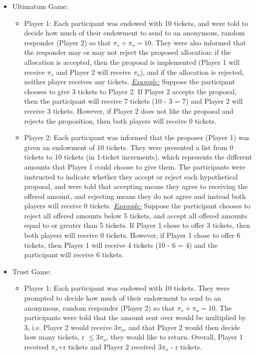 \documentclass[12pt]{article}
\begin{document}
\begin{itemize}
\item{Ultimatum Game}: 
	\begin{itemize}
		\item{Player 1}: Each participant was endowed with 10 tickets, and were told to decide how much of their endowment to send to an anonymous, random responder (Player 2) so that \(\pi_{s} + \pi_{o} = 10\). They were also informed that the responder may or may not reject the proposed allocation: if the allocation is accepted, then the proposal is implemented (Player 1 will receive \(\pi_{s}\) and Player 2 will receive \(\pi_{o}\)), and if the allocation is rejected, neither player receives any tickets.
		\subitem \underline{\textit{Example:}} Suppose the participant chooses to give 3 tickets to Player 2. If Player 2 accepts the proposal, then the participant will receive 7 tickets (10 - 3 = 7) and Player 2 will receive 3 tickets. However, if Player 2 does not like the proposal and rejects the proposition, then both players will receive 0 tickets.
		\item{Player 2}: Each participant was informed that the proposer (Player 1) was given an endowment of 10 tickets. They were presented a list from 0 tickets to 10 tickets (in 1-ticket increments), which represents the different amounts that Player 1 could choose to give them. The participants were instructed to indicate whether they accept or reject each hypothetical proposal, and were told that accepting means they agree to receiving the offered amount, and rejecting means they do not agree and instead both players will receive 0 tickets.
		\subitem \underline{\textit{Example:}} Suppose the participant chooses to reject all offered amounts below 5 tickets, and accept all offered amounts equal to or greater than 5 tickets. If Player 1 chose to offer 3 tickets, then both players will receive 0 tickets. However, if Player 1 chose to offer 6 tickets, then Player 1 will receive 4 tickets (10 - 6 = 4) and the participant will receive 6 tickets.
	\end{itemize}
\item{Trust Game}:
	\begin{itemize}
		\item{Player 1}: Each participant was endowed with 10 tickets. They were prompted to decide how much of their endowment to send to an anonymous, random responder (Player 2) so that \(\pi_{s} + \pi_{o} = 10\). The participants were told that the amount sent over would be multiplied by 3, i.e. Player 2 would receive 3\(\pi_{o}\), and that Player 2 would then decide how many tickets, r \(\leq 3\pi_{o}\), they would like to return. Overall, Player 1 received \(\pi_{s}\)+r tickets and Player 2 received 3\(\pi_{o}\) - r tickets.

\end{itemize}
\end{itemize}
\end{document}
